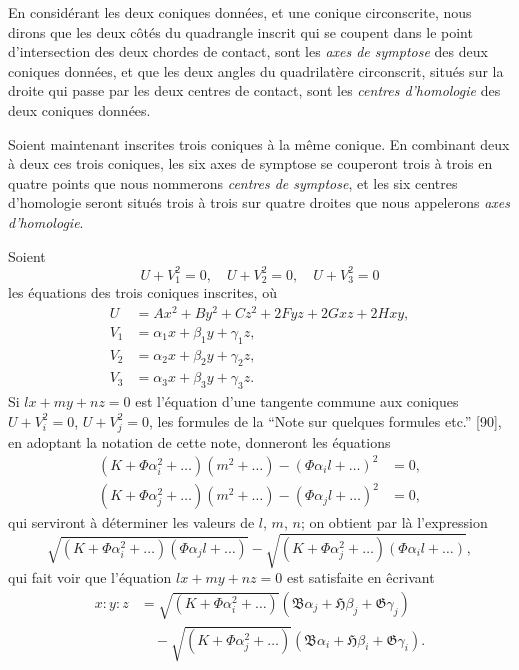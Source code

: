 \documentclass[12pt,a4paper]{article}
\theoremstyle{definition}
\begin{document}
En consid\'{e}rant les deux coniques donn\'{e}es, et une conique circonscrite, nous dirons que les deux c\^{o}t\'{e}s du quadrangle inscrit qui se coupent dans le point d'intersection des deux chordes de contact, sont les \emph{axes de symptose} des deux coniques donn\'{e}es, et que les deux angles du quadrilat\`{e}re circonscrit, situ\'{e}s sur la droite qui passe par les deux centres de contact, sont les \emph{centres d'homologie} des deux coniques donn\'{e}es.

Soient maintenant inscrites trois coniques \`{a} la m\^{e}me conique. En combinant deux \`{a} deux ces trois coniques, les six axes de symptose se couperont trois \`{a} trois en quatre points que nous nommerons \emph{centres de symptose}, et les six centres d'homologie seront situ\'{e}s trois \`{a} trois sur quatre droites que nous appelerons \emph{axes d'homologie}.

Soient
\[
U + V_1^2 = 0, \quad U + V_2^2 = 0, \quad U + V_3^2 = 0
\]
les \'{e}quations des trois coniques inscrites, o\`{u}
\begin{align*}
U &= Ax^2 + By^2 + Cz^2 + 2Fyz + 2Gxz + 2Hxy, \\
V_1 &= \alpha_1 x + \beta_1 y + \gamma_1 z, \\
V_2 &= \alpha_2 x + \beta_2 y + \gamma_2 z, \\
V_3 &= \alpha_3 x + \beta_3 y + \gamma_3 z.
\end{align*}
Si $lx + my + nz = 0$ est l'\'{e}quation d'une tangente commune aux coniques $U + V_i^2 = 0$, $U + V_j^2 = 0$, les formules de la ``Note sur quelques formules etc.'' [90], en adoptant la notation de cette note, donneront les \'{e}quations
\begin{align*}
(K + \Phi\alpha_i^2 + \ldots)(m^2 + \ldots) - (\Phi\alpha_i l + \ldots)^2 &= 0, \\
(K + \Phi\alpha_j^2 + \ldots)(m^2 + \ldots) - (\Phi\alpha_j l + \ldots)^2 &= 0,
\end{align*}
qui serviront \`{a} d\'{e}terminer les valeurs de $l$, $m$, $n$; on obtient par l\`{a} l'expression
\[
\sqrt{(K + \Phi\alpha_i^2 + \ldots)(\Phi\alpha_j l + \ldots)} - \sqrt{(K + \Phi\alpha_j^2 + \ldots)(\Phi\alpha_i l + \ldots)},
\]
qui fait voir que l'\'{e}quation $lx + my + nz = 0$ est satisfaite en \^{e}crivant
\begin{equation}\tag{1}
\begin{aligned}
x : y : z &= \sqrt{(K + \Phi\alpha_i^2 + \ldots)}(\mathfrak{B}\alpha_j + \mathfrak{H}\beta_j + \mathfrak{G}\gamma_j) \\
&\quad - \sqrt{(K + \Phi\alpha_j^2 + \ldots)}(\mathfrak{B}\alpha_i + \mathfrak{H}\beta_i + \mathfrak{G}\gamma_i).
\end{aligned}
\end{equation}
\end{document}
